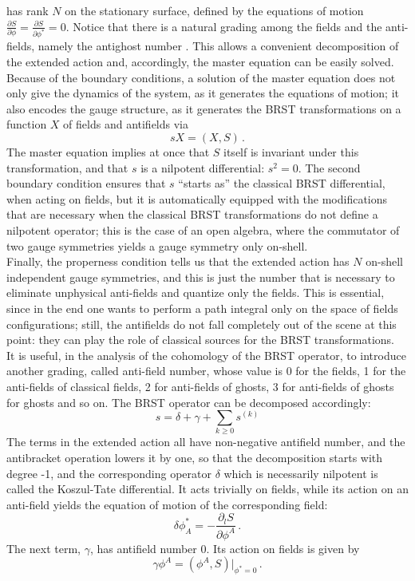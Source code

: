 \documentclass[a4paper,12pt]{article}
\begin{document}
has rank $N$ on the stationary surface, defined by the equations of motion 
$\displaystyle{ \frac{\partial S}{\partial \phi} = \frac{\partial S}{\partial
  \phi^*} =0}$.
Notice that there is a natural grading among the 
fields and the anti-fields, namely the antighost number
\cite{gomis}. This allows a convenient  
decomposition of the extended action and, accordingly, the master
equation can be easily solved. \\
Because of the boundary conditions, a solution of the master equation
does not only give the dynamics of the  
system, as it generates the equations of motion; it also encodes the
gauge structure, as it generates the BRST transformations on a
function $X$ of fields and antifields via 
\begin{displaymath}
  s X = (X,S) \, .
\end{displaymath}
The master equation implies at once that $S$ itself is invariant under
this transformation, and that $s$ is a nilpotent differential: $s^2 =
0$. The second boundary condition ensures that $s$ ``starts as'' the
classical BRST differential, when acting on fields, but it is
automatically equipped with the modifications that are necessary when
the classical BRST transformations do not define a nilpotent operator;
this is the case of an open algebra, where the commutator of two gauge
symmetries
yields a gauge symmetry only on-shell. \\
Finally, the properness condition tells us that the extended action
has $N$ on-shell independent gauge symmetries, and this is just the
number that is necessary to eliminate unphysical anti-fields and
quantize only the fields. This is essential, since in the end one
wants to perform a path integral only on the space of fields
configurations; still, the antifields do not fall completely out of
the scene at this point: they can play the role
of classical sources for the BRST transformations. \\
It is useful, in the analysis of the cohomology of the BRST operator,
to introduce another grading, called anti-field number, whose value is
0 for the fields, 1 for the anti-fields of classical fields, 2 for
anti-fields of ghosts, 3 for anti-fields of ghosts for ghosts and so on.
The BRST operator can be decomposed accordingly:
\begin{displaymath}
  s = \delta + \gamma + \sum_{k \geq 0} s^{(k)} 
\end{displaymath}
The terms in the extended action all have non-negative antifield
number, and the antibracket operation lowers it by one, so that the
decomposition starts with degree -1, and the corresponding operator
$\delta$ which is necessarily nilpotent is called the Koszul-Tate
differential. It acts trivially on fields, while its action on an
anti-field yields the equation of motion of the corresponding field:
\begin{displaymath}
  \delta \phi_A^* = - \frac{\partial_l S}{\partial \phi^A} \, .
\end{displaymath}
The next term, $\gamma$, has antifield number 0. Its action on fields
is given by
\begin{displaymath} \label{eq:BRST}
  \gamma \phi^A = (\phi^A, S) |_{\phi^* = 0} \, .
\end{displaymath}
\end{document}

